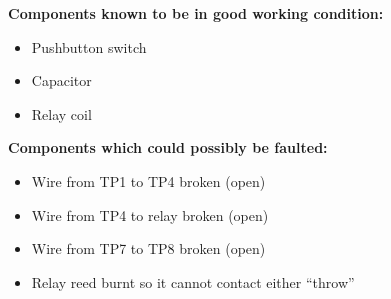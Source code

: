 





\goodbreak
\noindent
{\bf Components known to be in good working condition:}

\begin{itemize}
\item{} Pushbutton switch
\item{} Capacitor
\item{} Relay coil
\end{itemize}

\vskip 10pt

\goodbreak
\noindent
{\bf Components which could possibly be faulted:}

\begin{itemize}
\item{} Wire from TP1 to TP4 broken (open)
\item{} Wire from TP4 to relay broken (open)
\item{} Wire from TP7 to TP8 broken (open)
\item{} Relay reed burnt so it cannot contact either ``throw''
\end{itemize}




